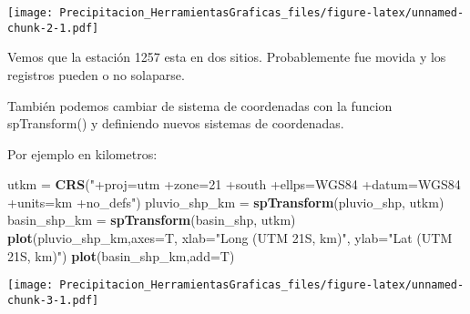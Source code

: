 \documentclass[]{article}
\newenvironment{Shaded}{\begin{snugshade}}{\end{snugshade}}
\newcommand{\DataTypeTok}[1]{\textcolor[rgb]{0.13,0.29,0.53}{#1}}
\newcommand{\DecValTok}[1]{\textcolor[rgb]{0.00,0.00,0.81}{#1}}
\newcommand{\KeywordTok}[1]{\textcolor[rgb]{0.13,0.29,0.53}{\textbf{#1}}}
\newcommand{\NormalTok}[1]{#1}
\newcommand{\OperatorTok}[1]{\textcolor[rgb]{0.81,0.36,0.00}{\textbf{#1}}}
\newcommand{\StringTok}[1]{\textcolor[rgb]{0.31,0.60,0.02}{#1}}
\begin{document}
\begin{Shaded}
\end{Shaded}

\texttt{[image: Precipitacion\_HerramientasGraficas\_files/figure-latex/unnamed-chunk-2-1.pdf]}

Vemos que la estación 1257 esta en dos sitios. Probablemente fue movida
y los registros pueden o no solaparse.

También podemos cambiar de sistema de coordenadas con la funcion
spTransform() y definiendo nuevos sistemas de coordenadas.

Por ejemplo en kilometros:

\begin{Shaded}
\begin{Highlighting}[]
\NormalTok{utkm =}\StringTok{ }\KeywordTok{CRS}\NormalTok{(}\StringTok{"+proj=utm +zone=21 +south +ellps=WGS84 +datum=WGS84 +units=km +no_defs"}\NormalTok{)}
\NormalTok{pluvio_shp_km =}\StringTok{ }\KeywordTok{spTransform}\NormalTok{(pluvio_shp, utkm)}
\NormalTok{basin_shp_km =}\StringTok{ }\KeywordTok{spTransform}\NormalTok{(basin_shp, utkm)}
\KeywordTok{plot}\NormalTok{(pluvio_shp_km,}\DataTypeTok{axes=}\NormalTok{T, }\DataTypeTok{xlab=}\StringTok{"Long (UTM 21S, km)"}\NormalTok{, }\DataTypeTok{ylab=}\StringTok{"Lat (UTM 21S, km)"}\NormalTok{)}
\KeywordTok{plot}\NormalTok{(basin_shp_km,}\DataTypeTok{add=}\NormalTok{T)}
\end{Highlighting}
\end{Shaded}

\texttt{[image: Precipitacion\_HerramientasGraficas\_files/figure-latex/unnamed-chunk-3-1.pdf]}
\end{document}
